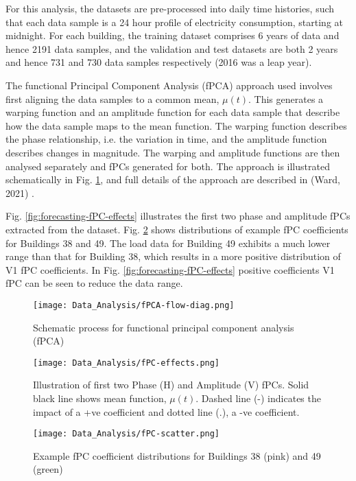 \begin{subappendices}
    For this analysis, the datasets are pre-processed into daily time histories, such that each data sample is a 24 hour profile of electricity consumption, starting at midnight. For each building, the training dataset comprises 6 years of data and hence 2191 data samples, and the validation and test datasets are both 2 years and hence 731 and 730 data samples respectively (2016 was a leap year).

    The functional Principal Component Analysis (fPCA) approach used involves first aligning the data samples to a common mean, $\mu(t)$. This generates a warping function and an amplitude function for each data sample that describe how the data sample maps to the mean function. The warping function describes the phase relationship, i.e. the variation in time, and the amplitude function describes changes in magnitude. The warping and amplitude functions are then analysed separately and fPCs generated for both. The approach is illustrated schematically in Fig. \ref{fig:forecasting-fPCA-method}, and full details of the approach are described in (Ward, 2021) \citep{ward2021DatacentricStochasticModel}.

    Fig. \ref{fig:forecasting-fPC-effects} illustrates the first two phase and amplitude fPCs extracted from the dataset. Fig. \ref{fig:forecasting-fPCs-scatter} shows distributions of example fPC coefficients for Buildings 38 and 49. The load data for Building 49 exhibits a much lower range than that for Building 38, which results in a more positive distribution of V1 fPC coefficients. In Fig. \ref{fig:forecasting-fPC-effects} positive coefficients V1 fPC can be seen to reduce the data range.

    \begin{figure}[p]
        \centering
        \texttt{[image: Data\_Analysis/fPCA-flow-diag.png]}
        \caption{Schematic process for functional principal component analysis (fPCA)}
        \label{fig:forecasting-fPCA-method}
    \end{figure}

    \begin{figure}[p]
        \centering
        \begin{minipage}{.525\textwidth}
            \centering
            \texttt{[image: Data\_Analysis/fPC-effects.png]}
            \caption{Illustration of first two Phase (H) and Amplitude (V) fPCs. Solid black line shows mean function, $\mu(t)$. Dashed line (-) indicates the impact of a +ve coefficient and dotted line (.), a -ve coefficient.}
            \label{fig:forecasting-fPC-effects}
        \end{minipage}%
        \hfill
        \begin{minipage}{.425\textwidth}
            \centering
            \texttt{[image: Data\_Analysis/fPC-scatter.png]}
            \caption{Example fPC coefficient distributions for Buildings 38 (pink) and 49 (green)}
        \label{fig:forecasting-fPCs-scatter}
        \end{minipage}%
    \end{figure}


\end{subappendices}
